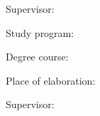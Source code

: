 


Supervisor: \mySupervisor

\medskip{}
\myDate


\newpage
\thispagestyle{empty}
\mbox{}
\newpage





Study program: \myStudyProgram

Degree course: \myDegreeCourse

Place of elaboration: \myInstitute

Supervisor: \mySupervisor

\medskip{}

\myDate


\newpage
\thispagestyle{empty}
\mbox{}
\newpage

